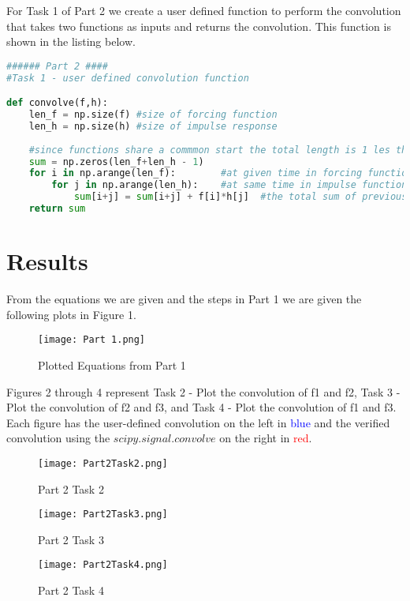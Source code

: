 \documentclass[12pt]{report}
\begin{document}
\newline
For Task 1 of Part 2 we create a user defined function to perform the convolution that takes two functions as inputs and returns the convolution. This function is shown in the listing below. 
\begin{lstlisting}[language=Python]
###### Part 2 ####
#Task 1 - user defined convolution function

def convolve(f,h):
    len_f = np.size(f) #size of forcing function
    len_h = np.size(h) #size of impulse response
    
    #since functions share a commmon start the total length is 1 les than the sum
    sum = np.zeros(len_f+len_h - 1)
    for i in np.arange(len_f):        #at given time in forcing function
        for j in np.arange(len_h):    #at same time in impulse function
            sum[i+j] = sum[i+j] + f[i]*h[j]  #the total sum of previous time with the current time
    return sum
\end{lstlisting}



\newpage 
\section{Results}
From the equations we are given and the steps in Part 1 we are given the following plots in Figure 1. 

\begin{figure}[htp]
    \centering
    \texttt{[image: Part 1.png]}
    \caption{Plotted Equations from Part 1}
    \label{fig:Part 1.png}
\end{figure}

Figures 2 through 4 represent Task 2 - Plot the convolution of f1 and f2, Task 3 - Plot the convolution of f2 and f3, and Task 4 - Plot the convolution of f1 and f3. Each figure has the user-defined convolution on the left in \textcolor{blue}{blue} and the verified convolution using the $scipy.signal.convolve$ on the right in \textcolor{red}{red}. 

\begin{figure}[htp]
    \centering
    \texttt{[image: Part2Task2.png]}
    \caption{Part 2 Task 2}
    \label{fig:Part 2 Task 2}
\end{figure}

\begin{figure}[htp]
    \centering
    \texttt{[image: Part2Task3.png]}
    \caption{Part 2 Task 3}
    \label{fig:Part 2 Task 3}
\end{figure}
\newpage
\begin{figure}[htp]
    \centering
    \texttt{[image: Part2Task4.png]}
    \caption{Part 2 Task 4}
    \label{fig:Part 2 Task 4}
\end{figure}
\end{document}

